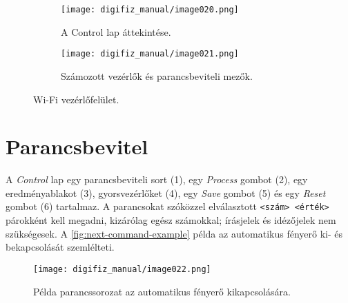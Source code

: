 \begin{figure}[htbp]
    \centering
    \begin{subfigure}{0.48\textwidth}
        \texttt{[image: digifiz\_manual/image020.png]}
        \caption{A Control lap áttekintése.}
    \end{subfigure}\hfill
    \begin{subfigure}{0.48\textwidth}
        \texttt{[image: digifiz\_manual/image021.png]}
        \caption{Számozott vezérlők és parancsbeviteli mezők.}
    \end{subfigure}
    \caption{\ReplicaNextShort{} Wi-Fi vezérlőfelület.}
    \label{fig:next-control-tabs}
\end{figure}

\section{Parancsbevitel}
A \emph{Control} lap egy parancsbeviteli sort (1), egy \emph{Process} gombot (2), egy eredményablakot (3), gyorsvezérlőket (4), egy \emph{Save} gombot (5) és egy \emph{Reset} gombot (6) tartalmaz. A parancsokat szóközzel elválasztott \verb|<szám> <érték>| párokként kell megadni, kizárólag egész számokkal; írásjelek és idézőjelek nem szükségesek. A \autoref{fig:next-command-example} példa az automatikus fényerő ki- és bekapcsolását szemlélteti.

\begin{figure}[htbp]
    \centering
    \texttt{[image: digifiz\_manual/image022.png]}
    \caption{Példa parancssorozat az automatikus fényerő kikapcsolására.}
    \label{fig:next-command-example}
\end{figure}

